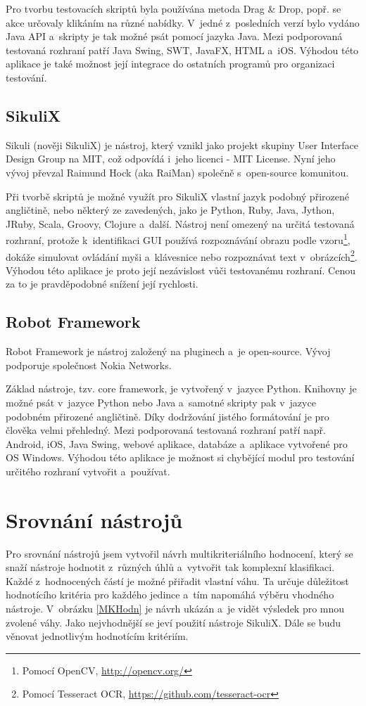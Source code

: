 \documentclass{bakalarka}
\begin{document}
	Pro tvorbu testovacích skriptů byla používána metoda Drag \& Drop, popř. se akce určovaly klikáním na různé nabídky. V~jedné z~posledních verzí bylo vydáno Java API a~skripty je tak možné psát pomocí jazyka Java. Mezi podporovaná testovaná rozhraní patří Java Swing, SWT, JavaFX, HTML a~iOS. Výhodou této aplikace je také možnost její integrace do ostatních programů pro organizaci testování.
	
	\section{SikuliX}
	Sikuli (nověji SikuliX) je nástroj, který vznikl jako projekt skupiny User Interface Design Group na MIT, což odpovídá i~jeho licenci - MIT License. Nyní jeho vývoj převzal Raimund Hock (aka RaiMan) společně s~open-source komunitou.
	
	Při tvorbě skriptů je možné využít pro SikuliX vlastní jazyk podobný přirozené angličtině, nebo některý ze zavedených, jako je Python, Ruby, Java, Jython, JRuby, Scala, Groovy, Clojure a~další. Nástroj není omezený na určitá testovaná rozhraní, protože k~identifikaci GUI používá rozpoznávání obrazu podle vzoru\footnote{Pomocí OpenCV, \url{http://opencv.org/}}, dokáže simulovat ovládání myši a~klávesnice nebo rozpoznávat text v~obrázcích\footnote{Pomocí Tesseract OCR, \url{https://github.com/tesseract-ocr}}. Výhodou této aplikace je proto její nezávislost vůči testovanému rozhraní. Cenou za to je pravděpodobné snížení její rychlosti.
	
	\section{Robot Framework}
	Robot Framework je nástroj založený na pluginech a~je open-source. Vývoj podporuje společnost Nokia Networks.
	
	Základ nástroje, tzv. core framework, je vytvořený v~jazyce Python. Knihovny je možné psát v~jazyce Python nebo Java a~samotné skripty pak v~jazyce podobném přirozené angličtině. Díky dodržování jistého formátování je pro člověka velmi přehledný. Mezi podporovaná testovaná rozhraní patří např. Android, iOS, Java Swing, webové aplikace, databáze a~aplikace vytvořené pro OS Windows. Výhodou této aplikace je možnost si chybějící modul pro testování určitého rozhraní vytvořit a~používat.
	
\chapter{Srovnání nástrojů}
Pro srovnání nástrojů jsem vytvořil návrh multikriteriálního hodnocení, který se snaží nástroje hodnotit z~různých úhlů a~vytvořit tak komplexní klasifikaci. Každé z~hodnocených částí je možné přiřadit vlastní váhu. Ta určuje důležitost hodnotícího kritéria pro každého jedince a~tím napomáhá výběru vhodného nástroje. V~obrázku \ref{MKHodn} je návrh ukázán a~je vidět výsledek pro mnou zvolené váhy. Jako nejvhodnější se jeví použití nástroje SikuliX. Dále se budu věnovat jednotlivým hodnotícím kritériím.
\end{document}

